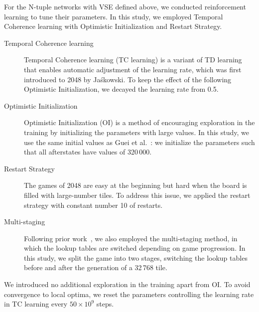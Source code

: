 
For the N-tuple networks with VSE defined above, we conducted reinforcement learning to tune their parameters.
In this study, we employed Temporal Coherence learning with Optimistic Initialization and Restart Strategy.
\begin{description}
 \item[Temporal Coherence learning~] Temporal Coherence learning (TC learning) is a variant of TD learning that enables automatic adjustment of the learning rate, which was first introduced to 2048 by Ja\'skowski.  To keep the effect of the following Optimistic Initialization, we decayed the learning rate from 0.5.
 \item[Optimistic Initialization~] Optimistic Initialization (OI) is a method of encouraging exploration in the training by initializing the parameters with large values.  In this study, we use the same initial values as Guei et al.~\cite{GuCW22}: we initialize the parameters such that all afterstates have values of 320\,000.
 \item[Restart Strategy~] The games of 2048 are easy at the beginning but hard when the board is filled with large-number tiles.  To address this issue, we applied the restart strategy with constant number 10 of restarts.
 \item[Multi-staging~] Following prior work~\cite{GuCW22}, we also employed the multi-staging method, in which the lookup tables are switched depending on game progression. In this study, we split the game into two stages, switching the lookup tables before and after the generation of a 32\,768 tile.
\end{description}
We introduced no additional exploration in the training apart from OI.
To avoid convergence to local optima, we reset the parameters controlling the learning rate in TC learning every $50 \times 10^9$ steps.

